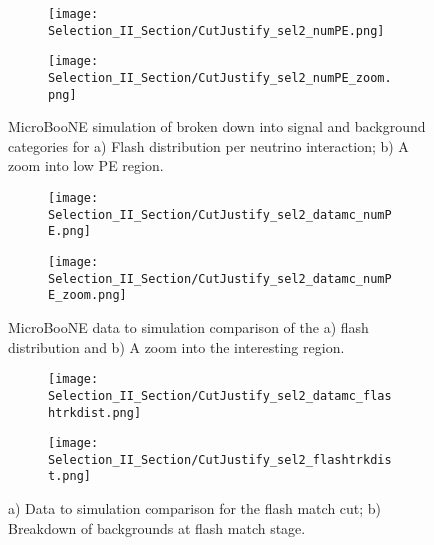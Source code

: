 \begin{figure}[t!]
  \centering
  \begin{subfigure}[t]{0.4\textwidth}
    \centering
    \texttt{[image: Selection\_II\_Section/CutJustify\_sel2\_numPE.png]}
    \caption{ }
  \end{subfigure}
    \hspace{10 mm}
   \begin{subfigure}[t]{0.4\textwidth}
    \centering
    \texttt{[image: Selection\_II\_Section/CutJustify\_sel2\_numPE\_zoom.png]}
    \caption{ }
  \end{subfigure}
\caption{ MicroBooNE simulation of broken down into signal and background categories for a) Flash distribution per neutrino interaction; b) A zoom into low PE region. }
\label{fig:cutjust_sel2_numPE}
\end{figure}


\begin{figure}[t!]
  \centering
  \begin{subfigure}[t]{0.4\textwidth}
    \centering
    \texttt{[image: Selection\_II\_Section/CutJustify\_sel2\_datamc\_numPE.png]}
    \caption{ }
  \end{subfigure} 
  \hspace{10 mm}
  \begin{subfigure}[t]{0.4\textwidth}
    \centering
    \texttt{[image: Selection\_II\_Section/CutJustify\_sel2\_datamc\_numPE\_zoom.png]}
    \caption{ }
  \end{subfigure}
\caption{ MicroBooNE data to simulation comparison of the a) flash distribution and b) A zoom into the interesting region. }
\label{fig:cutjust_sel2_numPE_datamc}
\end{figure}

\begin{figure}[h!]
\centering
  \begin{subfigure}[t]{0.4\textwidth}
    \centering
\texttt{[image: Selection\_II\_Section/CutJustify\_sel2\_datamc\_flashtrkdist.png]}
    \caption{ }
  \end{subfigure} 
  \hspace{10 mm}
  \begin{subfigure}[t]{0.4\textwidth}
    \centering
\texttt{[image: Selection\_II\_Section/CutJustify\_sel2\_flashtrkdist.png]}
    \caption{ }
  \end{subfigure} 
\caption{ a) Data to simulation comparison for the flash match cut; b) Breakdown of backgrounds at flash match stage. }
\label{fig:cutjust_sel2_flashtrkdist}
\end{figure}

